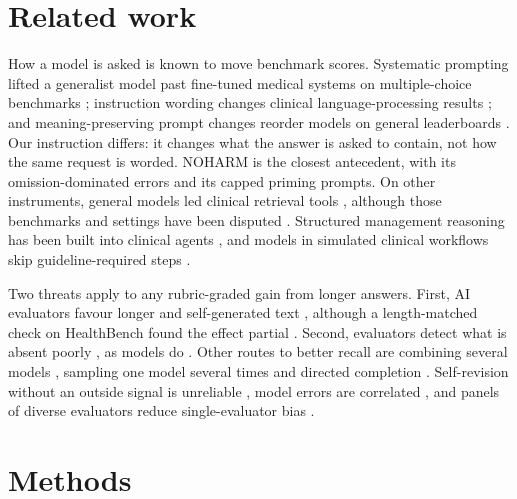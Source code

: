\documentclass[11pt]{article}
\begin{document}
\section{Related work}
\label{sec:related}
How a model is asked is known to move benchmark scores. Systematic prompting lifted a generalist
model past fine-tuned medical systems on multiple-choice benchmarks \citep{nori2023medprompt};
instruction wording changes clinical language-processing results \citep{ceballos2024open}; and
meaning-preserving prompt changes reorder models on general leaderboards
\citep{sclar2024quantifying,mizrahi2024state,polo2024efficient}. Our instruction differs: it changes
what the answer is asked to contain, not how the same request is worded. NOHARM \citep{wu2025noharm}
is the closest antecedent, with its omission-dominated errors and its capped priming prompts. On other
instruments, general models led clinical retrieval tools \citep{vishwanath2026general}, although
those benchmarks and settings have been disputed \citep{beaulieujones2026limited}. Structured
management reasoning has been built into clinical agents \citep{palepu2025disease}, and models in
simulated clinical workflows skip guideline-required steps \citep{hager2024evaluation}.

Two threats apply to any rubric-graded gain from longer answers. First, AI evaluators favour longer
and self-generated text
\citep{zheng2023judging,saito2023verbosity,dubois2024length,panickssery2024recognize,wataoka2024selfpreference},
although a length-matched check on HealthBench found the effect partial \citep{arora2025healthbench}.
Second, evaluators detect what is absent poorly \citep{fox2026omission}, as models do
\citep{absencebench2025}. Other routes to better recall are combining several models
\citep{wang2024mixture}, sampling one model several times \citep{selfmoa2025} and directed completion
\citep{cdr2026}. Self-revision without an outside signal is unreliable \citep{huang2024cannot}, model
errors are correlated \citep{kim2025correlated}, and panels of diverse evaluators reduce
single-evaluator bias \citep{verga2024poll}.

\section{Methods}
\end{document}
